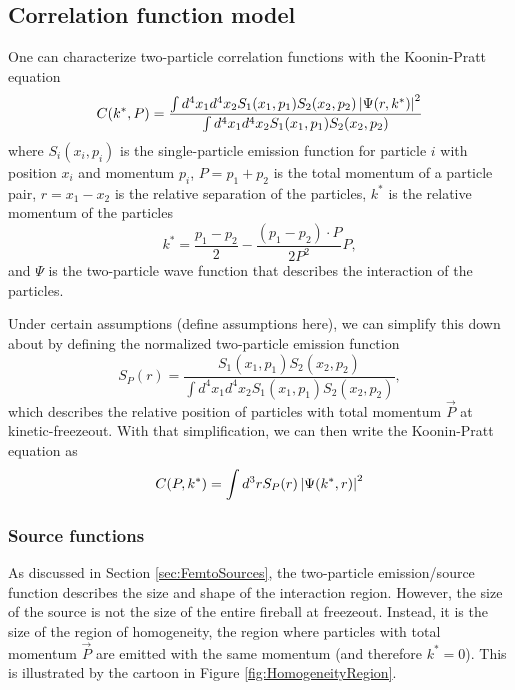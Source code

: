 \subsection{Correlation function model}
\label{sec:CorrelationFunctionModel}



One can characterize two-particle correlation functions with the Koonin-Pratt equation
\begin{equation}
\label{eq:BiggerKooninPratt}
C(k^*,P) = \frac{\int d^4x_1d^4x_2 S_1(x_1,p_1) S_2(x_2,p_2)\left\lvert\Psi(r,k^*)\right\rvert^2}{\int d^4x_1d^4x_2 S_1(x_1,p_1) S_2(x_2,p_2)}
\end{equation}
where $S_i(x_i,p_i)$ is the single-particle emission function for particle $i$ with position $x_i$ and momentum $p_i$, $P = p_1 + p_2$ is the total momentum of a particle pair,  $r = x_1 - x_2$ is the relative separation of the particles, $k^*$ is the relative momentum of the particles
\begin{equation}
\label{eq:kstar}
k^* = \frac{p_1 - p_2}{2} -\frac{(p_1 - p_2)\cdot P}{2P^2}P,
\end{equation}
and $\Psi$ is the two-particle wave function that describes the interaction of the particles.

Under certain assumptions (define assumptions here), we can simplify this down about by defining the normalized two-particle emission function
\begin{equation}
\label{eq:TwoParticleEmissionFunction}
S_P(r)=\frac{S_1(x_1,p_1) S_2(x_2,p_2)}{\int d^4x_1d^4x_2 S_1(x_1,p_1) S_2(x_2,p_2)},
\end{equation}
which describes the relative position of particles with total momentum $\vec{P}$ at kinetic-freezeout.
With that simplification, we can then write the Koonin-Pratt equation as 
\begin{equation}
\label{eq:KooninPratt}
C(P, k^*) =  \int d^3r S_{P} (r) \left\lvert\Psi(k^*,r)\right\rvert^2
\end{equation}

\subsubsection{Source functions}
\label{sec:SourceFunctions}

As discussed in Section \ref{sec:FemtoSources}, the two-particle emission/source function describes the size and shape of the interaction region.
However, the size of the source is not the size of the entire fireball at freezeout.
Instead, it is the size of the region of homogeneity, the region where particles with total momentum $\vec{P}$ are emitted with the same momentum (and therefore $k^* = 0$).
This is illustrated by the cartoon in Figure \ref{fig:HomogeneityRegion}.

